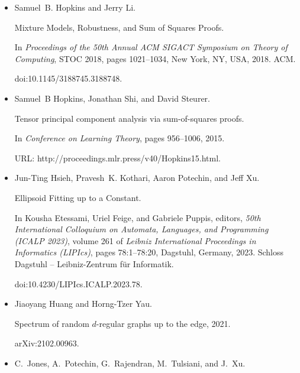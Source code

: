 \begin{itemize}
\item[] 
[20]

Samuel B. Hopkins and Jerry Li.


Mixture Models, Robustness, and Sum of Squares Proofs.


In \emph{Proceedings of the 50th Annual ACM SIGACT Symposium on Theory
of Computing}, STOC 2018, pages 1021–1034, New York, NY, USA, 2018. ACM.


doi:10.1145/3188745.3188748.





\item[] 
[21]

Samuel B Hopkins, Jonathan Shi, and David Steurer.


Tensor principal component analysis via sum-of-squares proofs.


In \emph{Conference on Learning Theory}, pages 956–1006, 2015.


URL: http://proceedings.mlr.press/v40/Hopkins15.html.





\item[] 
[22]

Jun-Ting Hsieh, Pravesh K. Kothari, Aaron Potechin, and Jeff Xu.


Ellipsoid Fitting up to a Constant.


In Kousha Etessami, Uriel Feige, and Gabriele Puppis, editors, \emph{50th International Colloquium on Automata, Languages, and Programming (ICALP
2023)}, volume 261 of \emph{Leibniz International Proceedings in Informatics
(LIPIcs)}, pages 78:1–78:20, Dagstuhl, Germany, 2023. Schloss Dagstuhl –
Leibniz-Zentrum für Informatik.


doi:10.4230/LIPIcs.ICALP.2023.78.





\item[] 
[23]

Jiaoyang Huang and Horng-Tzer Yau.


Spectrum of random $d$-regular graphs up to the edge, 2021.


arXiv:2102.00963.





\item[] 
[24]

C. Jones, A. Potechin, G. Rajendran, M. Tulsiani, and J. Xu.



\end{itemize}
